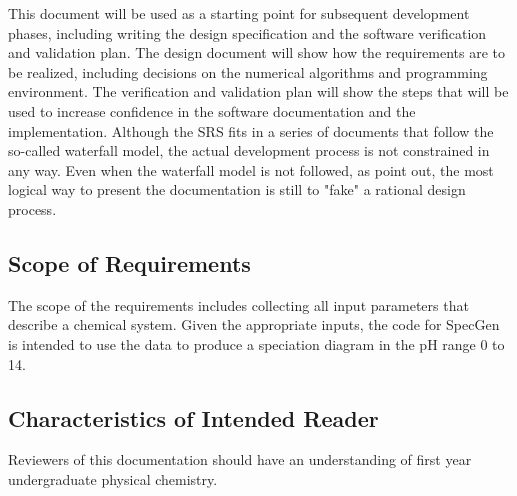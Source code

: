 \documentclass[12pt]{article}
\begin{document}
This document will be used as a starting point for subsequent development
phases, including writing the design specification and the software verification
and validation plan. The design document will show how the requirements are to
be realized, including decisions on the numerical algorithms and programming
environment. The verification and validation plan will show the steps that will
be used to increase confidence in the software documentation and the
implementation. Although the SRS fits in a series of documents that follow the
so-called waterfall model, the actual development process is not constrained in
any way. Even when the waterfall model is not followed, as
\cite{ParnasAndClements1986} point out, the most logical way to present the
documentation is still to "fake"  a rational design process.


\subsection{Scope of Requirements} 
 
The scope of the requirements includes collecting all input parameters that
describe a chemical system. Given the appropriate inputs, the code for SpecGen
is intended to use the data to produce a speciation diagram in the pH range 0 to
14.  

\subsection{Characteristics of Intended Reader} 
Reviewers of this documentation should have an understanding of first year undergraduate physical chemistry.
\end{document}
